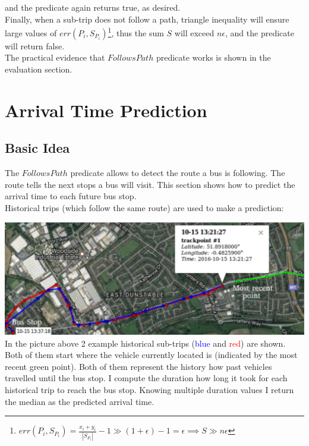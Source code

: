 \documentclass[12pt,a4paper,oneside,openright]{report}
\begin{document}
and the predicate again returns true, as desired. \\

Finally, when a sub-trip does not follow a path,
triangle inequality will ensure large values of
$err(P_i, S_{P_i})$\footnote{$err(P_i, S_{P_i}) = \frac{x_i + y_i}{|S_{P_i}|} - 1
\gg (1 + \epsilon) - 1 = \epsilon \implies S \gg n\epsilon$},
thus the sum $S$ will exceed $n\epsilon$, and the predicate will return false. \\

The practical evidence that $FollowsPath$ predicate works is shown in the 
evaluation section.

\newpage

\section{Arrival Time Prediction}

\subsection{Basic Idea}

The $FollowsPath$ predicate allows to detect the route a bus is following.
The route tells the next stops a bus will visit. This section shows how to
predict the arrival time to each future bus stop. \\

Historical trips (which follow the same route) are used to make a prediction:

\includegraphics[width=\textwidth]{figs/future_stop.png} \\

In the picture above 2 example historical sub-trips (\textcolor{blue}{blue}
and \textcolor{red}{red}) are shown.
Both of them start where the vehicle currently located is (indicated
by the most recent green point). Both of them represent the history how past
vehicles travelled until the bus stop. I compute the duration how long it
took for each historical trip to reach the bus stop. Knowing multiple duration
values I return the median as the predicted arrival time.
\end{document}
